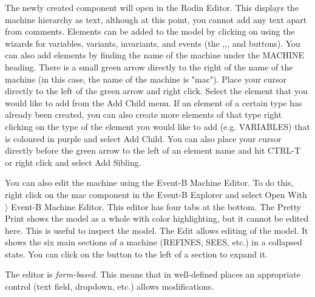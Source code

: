 The newly created component will open in the Rodin Editor. This displays the machine hierarchy as text, although at this point, you cannot add any text apart from comments. Elements can be added to the model by clicking on using the wizards for variables, variants, invariants, and events (the ,,, and  buttons). You can also add elements by finding the name of the machine under the MACHINE heading. There is a small green arrow directly to the right of the name of the machine (in this case, the name of the machine is "mac"). Place your cursor directly to the left of the green arrow and right click. Select the element that you would like to add from the \textsf{Add Child} menu. If an element of a certain type has already been created, you can also create more elements of that type right clicking on the type of the element you would like to add (e.g. \textsf{VARIABLES}) that is coloured in purple and select \textsf{Add Child}. You can also place your cursor directly before the green arrow to the left of an element name and hit \textsf{CTRL-T} or right click and select \textsf{Add Sibling}.

You can also edit the machine using the Event-B Machine Editor. To do this, right click on the mac component in the Event-B Explorer and select \textsf{Open With $\rangle$ Event-B Machine Editor}. This editor has four tabs at the bottom.  The \textsf{Pretty Print} shows the model as a whole with color highlighting, but it cannot be edited here.  This is useful to inspect the model.  The \textsf{Edit} allows editing of the model.  It shows the six main sections of a machine (REFINES, SEES, etc.) in a collapsed state.  You can click on the  button to the left of a section to expand it.


The editor is \textit{form-based}.  This means that in well-defined places an appropriate control (text field, dropdown, etc.) allows modifications. 


